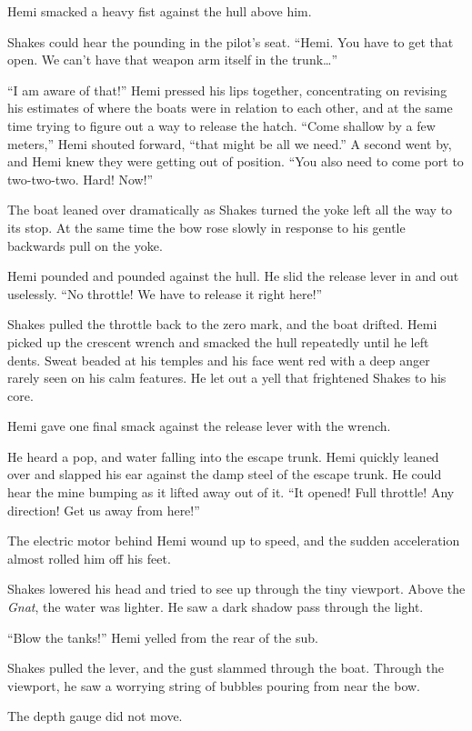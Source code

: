 \documentclass[
]{scrbook}
\begin{document}
Hemi smacked a heavy fist against the hull above him.

Shakes could hear the pounding in the pilot's seat. ``Hemi. You have to
get that open. We can't have that weapon arm itself in the
trunk\ldots{}''

``I am aware of that!'' Hemi pressed his lips together, concentrating on
revising his estimates of where the boats were in relation to each
other, and at the same time trying to figure out a way to release the
hatch. ``Come shallow by a few meters,'' Hemi shouted forward, ``that
might be all we need.'' A second went by, and Hemi knew they were
getting out of position. ``You also need to come port to two-two-two.
Hard! Now!''

The boat leaned over dramatically as Shakes turned the yoke left all the
way to its stop. At the same time the bow rose slowly in response to his
gentle backwards pull on the yoke.

Hemi pounded and pounded against the hull. He slid the release lever in
and out uselessly. ``No throttle! We have to release it right here!''

Shakes pulled the throttle back to the zero mark, and the boat drifted.
Hemi picked up the crescent wrench and smacked the hull repeatedly until
he left dents. Sweat beaded at his temples and his face went red with a
deep anger rarely seen on his calm features. He let out a yell that
frightened Shakes to his core.

Hemi gave one final smack against the release lever with the wrench.

He heard a pop, and water falling into the escape trunk. Hemi quickly
leaned over and slapped his ear against the damp steel of the escape
trunk. He could hear the mine bumping as it lifted away out of it. ``It
opened! Full throttle! Any direction! Get us away from here!''

The electric motor behind Hemi wound up to speed, and the sudden
acceleration almost rolled him off his feet.

Shakes lowered his head and tried to see up through the tiny viewport.
Above the \emph{Gnat}, the water was lighter. He saw a dark shadow pass
through the light.

``Blow the tanks!'' Hemi yelled from the rear of the sub.

Shakes pulled the lever, and the gust slammed through the boat. Through
the viewport, he saw a worrying string of bubbles pouring from near the
bow.

The depth gauge did not move.
\end{document}
